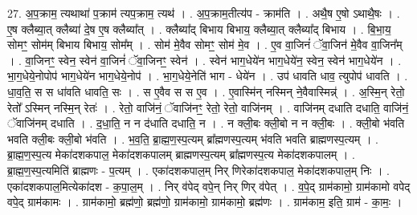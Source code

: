\documentclass[17pt]{extarticle}
\begin{document}
27. अ॒प॒क्राम॒ त्यथाथा॑ प॒क्राम॑ त्यप॒क्राम॒ त्यथ॑ । . अ॒प॒क्राम॒तीत्य॑प - क्राम॑ति । . अथै॒ष ए॒षो ऽथाथै॒षः । . ए॒ष क्लैब्या॒त् क्लैब्या॑ दे॒ष ए॒ष क्लैब्या᳚त् । . क्लैब्या᳚द् बिभाय बिभाय॒ क्लैब्या॒त् क्लैब्या᳚द् बिभाय । . बि॒भा॒य॒ सोमꣳ॒॒ सोम॑म् बिभाय बिभाय॒ सोम᳚म् । . सोम॑ मे॒वैव सोमꣳ॒॒ सोम॑ मे॒व । . ए॒व वा॒जिनं॑ ॅवा॒जिन॑ मे॒वैव वा॒जिन᳚म् । . वा॒जिनꣳ॒॒ स्वेन॒ स्वेन॑ वा॒जिनं॑ ॅवा॒जिनꣳ॒॒ स्वेन॑ । . स्वेन॑ भाग॒धेये॑न भाग॒धेये॑न॒ स्वेन॒ स्वेन॑ भाग॒धेये॑न । . भा॒ग॒धेये॒नोपोप॑ भाग॒धेये॑न भाग॒धेये॒नोप॑ । . भा॒ग॒धेये॒नेति॑ भाग - धेये॑न । . उप॑ धावति धाव॒ त्युपोप॑ धावति । . धा॒व॒ति॒ स स धा॑वति धावति॒ सः । . स ए॒वैव स स ए॒व । . ए॒वास्मि॑न् नस्मिन् ने॒वैवास्मिन्न्॑ । . अ॒स्मि॒न् रेतो॒ रेतो᳚ ऽस्मिन् नस्मि॒न् रेतः॑ । . रेतो॒ वाजि॑नं॒ ॅवाजि॑नꣳ॒॒ रेतो॒ रेतो॒ वाजि॑नम् । . वाजि॑नम् दधाति दधाति॒ वाजि॑नं॒ ॅवाजि॑नम् दधाति । . द॒धा॒ति॒ न न द॑धाति दधाति॒ न । . न क्ली॒बः क्ली॒बो न न क्ली॒बः । . क्ली॒बो भ॑वति भवति क्ली॒बः क्ली॒बो भ॑वति । . भ॒व॒ति॒ ब्रा॒ह्म॒ण॒स्प॒त्यम् ब्रा᳚ह्मणस्प॒त्यम् भ॑वति भवति ब्राह्मणस्प॒त्यम् । . ब्रा॒ह्म॒ण॒स्प॒त्य मेका॑दशकपाल॒ मेका॑दशकपालम् ब्राह्मणस्प॒त्यम् ब्रा᳚ह्मणस्प॒त्य मेका॑दशकपालम् । . ब्रा॒ह्म॒ण॒स्प॒त्यमिति॑ ब्राह्मणः - प॒त्यम् । . एका॑दशकपाल॒म् निर् णिरेका॑दशकपाल॒ मेका॑दशकपाल॒म् निः । . एका॑दशकपाल॒मित्येका॑दश - क॒पा॒ल॒म् । . निर् व॑पेद् वपे॒न् निर् णिर् व॑पेत् । . व॒पे॒द् ग्राम॑कामो॒ ग्राम॑कामो वपेद् वपे॒द् ग्राम॑कामः । . ग्राम॑कामो॒ ब्रह्म॑णो॒ ब्रह्म॑णो॒ ग्राम॑कामो॒ ग्राम॑कामो॒ ब्रह्म॑णः । . ग्राम॑काम॒ इति॒ ग्राम॑ - का॒मः॒ । \newline
\end{document}
